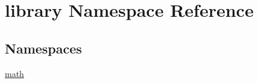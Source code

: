 \hypertarget{namespacelibrary}{}\section{library Namespace Reference}
\label{namespacelibrary}
\subsection*{Namespaces}
\begin{DoxyCompactItemize}
\item 
 \hyperlink{namespacelibrary_1_1math}{math}
\end{DoxyCompactItemize}

